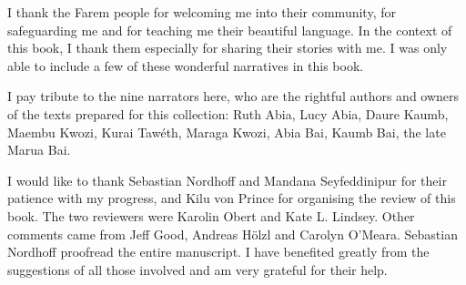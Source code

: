 \addchap{\lsAcknowledgementTitle} 

I thank the Farem people for welcoming me into their community, for safeguarding me and for teaching me their beautiful language. In the context of this book, I thank them especially for sharing their stories with me. I was only able to include a few of these wonderful narratives in this book.

I pay tribute to the nine narrators here, who are the rightful authors and owners of the texts prepared for this collection: Ruth Abia, Lucy Abia, Daure Kaumb, Maembu Kwozi, Kurai Tawéth, Maraga Kwozi, Abia Bai, Kaumb Bai, the late Marua Bai.

I would like to thank Sebastian Nordhoff and Mandana Seyfeddinipur for their patience with my progress, and Kilu von Prince for organising the review of this book. The two reviewers were Karolin Obert and Kate L. Lindsey. Other comments came from Jeff Good, Andreas Hölzl and Carolyn O'Meara. Sebastian Nordhoff proofread the entire manuscript. I have benefited greatly from the suggestions of all those involved and am very grateful for their help.